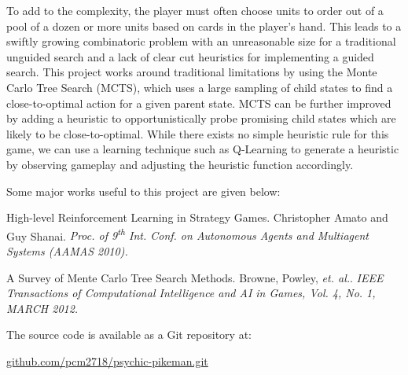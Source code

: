 \documentclass[landscape,final,a0paper,fontscale=0.277]{baposter}
\begin{document}
\begin{poster}
{

To add to the complexity, the player must often choose units to order out of a pool of a dozen or more units based on cards in the player's hand. This leads to a swiftly growing combinatoric problem with an unreasonable size for a traditional unguided search and a lack of clear cut heuristics for implementing a guided search. This project works around traditional limitations by using the Monte Carlo Tree Search (MCTS), which uses a large sampling of child states to find a close-to-optimal action for a given parent state. MCTS can be further improved by adding a heuristic to opportunistically probe promising child states which are likely to be close-to-optimal. While there exists no simple heuristic rule for this game, we can use a learning technique such as Q-Learning to generate a heuristic by observing gameplay and adjusting the heuristic function accordingly.
}

{
}

{
Some major works useful to this project are given below:

\begin{thebibliography}{9}

  High-level Reinforcement Learning in Strategy Games. Christopher Amato and Guy Shanai. {\it Proc. of 9\textsuperscript{th} Int. Conf. on Autonomous Agents and Multiagent Systems (AAMAS 2010).}

  A Survey of Mente Carlo Tree Search Methods. Browne, Powley, {\it et. al.}. {\it IEEE Transactions of Computational Intelligence and AI in Games, Vol. 4, No. 1, MARCH 2012.}

\end{thebibliography}
}

{
The source code is available as a Git repository at:

\indent{    } \url{github.com/pcm2718/psychic-pikeman.git}
}

\end{poster}
\end{document}
